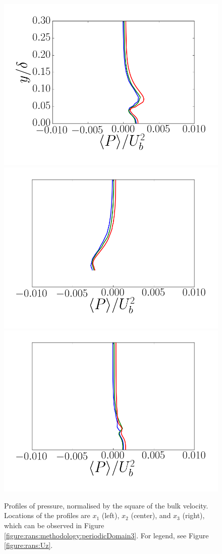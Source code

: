 \documentclass[12pt,oneside,a4paper]{article}
\begin{document}
\begin{figure}
\centering
\includegraphics[width=0.33\linewidth]{images/CFD_meshIndependence/X1_p.png}\hfill \includegraphics[width=0.33\linewidth]{images/CFD_meshIndependence/X2_p.png}\hfill
\includegraphics[width=0.33\linewidth]{images/CFD_meshIndependence/X3_p.png}\hfill
\caption{Profiles of pressure, normalised by the square of the bulk velocity. Locations of the profiles are $x_1$ (left), $x_2$ (center), and $x_3$ (right), which can be observed in Figure \ref{figure:rans:methodology:periodicDomain3}. For legend, see Figure \ref{figure:rans:Uz}.}
\label{figure:rans:p}
\end{figure}
\end{document}
